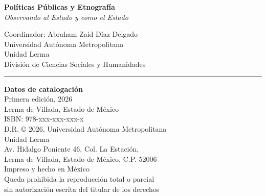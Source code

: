 \documentclass[
  spanish,
  11.5pt,
  170mm x 240mmpaper,
]{scrbook}
\begin{document}
\clearpage

\begin{titlepage}
    \thispagestyle{empty}
    \pagestyle{empty}
    
    \vspace*{2cm}
    
    \begin{center}
        \textbf{Políticas Públicas y Etnografía} \\
        \textit{Observando al Estado y como el Estado} \\
        \vspace{0.5cm}
        
        \small
        Coordinador: Abraham Zaíd Díaz Delgado \\
        Universidad Autónoma Metropolitana \\
        Unidad Lerma \\
        División de Ciencias Sociales y Humanidades \\
        \vspace{1cm}
        
        \rule{0.6\textwidth}{0.4pt}
        \vspace{0.5cm}
        
        \small
        \textbf{Datos de catalogación} \\
        \vspace{0.3cm}
        Primera edición, 2026 \\
        Lerma de Villada, Estado de México \\
        \vspace{0.3cm}
        ISBN: 978-xxx-xxx-xxx-x \\
        D.R. © 2026, Universidad Autónoma Metropolitana \\
        Unidad Lerma \\
        Av. Hidalgo Poniente 46, Col. La Estación, \\
        Lerma de Villada, Estado de México, C.P. 52006 \\
        \vspace{0.3cm}
        Impreso y hecho en México \\
        \vspace{0.3cm}
        Queda prohibida la reproducción total o parcial \\
        sin autorización escrita del titular de los derechos
    \end{center}
\end{titlepage}
\end{document}
